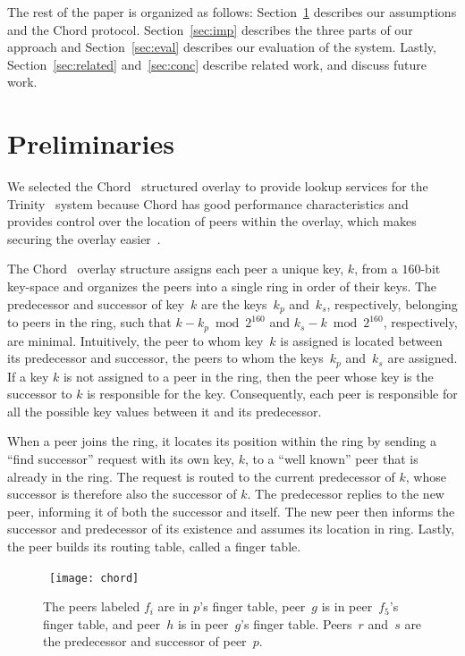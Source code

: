 \documentclass[11pt]{article}
\begin{document}
The rest of the paper is organized as follows: Section~\ref{sec:bg}
describes our assumptions and the Chord protocol.  Section~\ref{sec:imp}
describes the three parts of our approach and Section~\ref{sec:eval}
describes our evaluation of the system.  Lastly, Section~\ref{sec:related}
and~\ref{sec:conc} describe related work, and discuss future work.


\section{Preliminaries}\label{sec:bg}
We selected the Chord~\cite{StMoKaKaBa01} structured overlay to
provide lookup services for the Trinity~\cite{BrBr07} system because
Chord has good performance characteristics and provides control over 
the location of peers within the overlay, which makes securing the 
overlay easier~\cite{SiMo02,CaDrGaRoWa02}.  

The Chord~\cite{StMoKaKaBa01} overlay structure assigns each peer
a unique key, $k$, from a $160$-bit key-space and organizes the
peers into a single ring in order of their keys.  The predecessor
and successor of key~$k$ are the keys~$k_p$ and~$k_s$, respectively,
belonging to peers in the ring, such that $k - k_p \bmod 2^{160}$
and $k_s - k \bmod 2^{160}$, respectively, are minimal.  Intuitively,
the peer to whom key~$k$ is assigned is located between its predecessor
and successor, the peers to whom the keys~$k_p$ and~$k_s$ are
assigned.  If a key $k$ is not assigned to a peer in the ring, then
the peer whose key is the successor to $k$ is responsible for the
key.  Consequently, each peer is responsible for all the possible
key values between it and its predecessor.

When a peer joins the ring, it locates its position within the ring
by sending a ``find successor'' request with its own key, $k$, to
a ``well known'' peer that is already in the ring.  The request is
routed to the current predecessor of $k$, whose successor is therefore
also the successor of $k$.  The predecessor replies to the new
peer, informing it of both the successor and itself.  The new peer
then informs the successor and predecessor of its existence and assumes
its location in ring.  Lastly, the peer builds its routing table,
called a finger table.

\begin{figure*}[htb]
  \begin{center}
  \ \texttt{[image: chord]}\
  \caption{The peers labeled $f_i$ are in $p$'s finger table, peer~$g$ is 
           in peer~$f_5$'s finger table, and peer~$h$ is in peer~$g$'s 
           finger table.  Peers~$r$ and~$s$ are the predecessor and 
           successor of peer~$p$.  \label{fig:chord}}
  \end{center}
\end{figure*}
\end{document}
